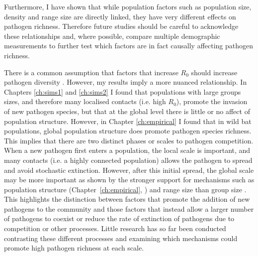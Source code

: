 Furthermore, I have shown that while population factors such as population size, density and range size are directly linked, they have very different effects on pathogen richness.
Therefore future studies should be careful to acknowledge these relationships and, where possible, compare multiple demographic measurements to further test which factors are in fact causally affecting pathogen richness.








There is a common assumption that factors that increase $R_0$ should increase pathogen diversity \cite{nunn2003comparative, morand2000wormy}.
However, my results imply a more nuanced relationship. 
In Chapters \ref{ch:sims1} and \ref{ch:sims2} I found that populations with large groups sizes, and therefore many localised contacts (i.e. high $R_0$), promote the invasion of new pathogen species, but that at the global level there is little or no affect of population structure.
However, in Chapter \ref{ch:empirical} I found that in wild bat populations, global population structure does promote pathogen species richness.
This implies that there are two distinct phases or scales to pathogen competition.
When a new pathogen first enters a population, the local scale is important, and many contacts (i.e. a highly connected population) allows the pathogen to spread and avoid stochastic extinction.
However, after this initial spread, the global scale may be more important as  shown by the stronger support for mechanisms such as population structure (Chapter~\ref{ch:empirical}, \textcite{turmelle2009correlates, maganga2014bat}) and range size \cite{kamiya2014determines, nunn2003comparative} than group size \cite{rifkin2012animals, ezenwa2006host}.
This highlights the distinction between factors that promote the addition of new pathogens to the community and those factors that instead allow a larger number of pathogens to coexist or reduce the rate of extinction of pathogens due to competition or other processes.
Little research has so far been conducted contrasting these different processes and examining which mechanisms could promote high pathogen richness at each scale.

